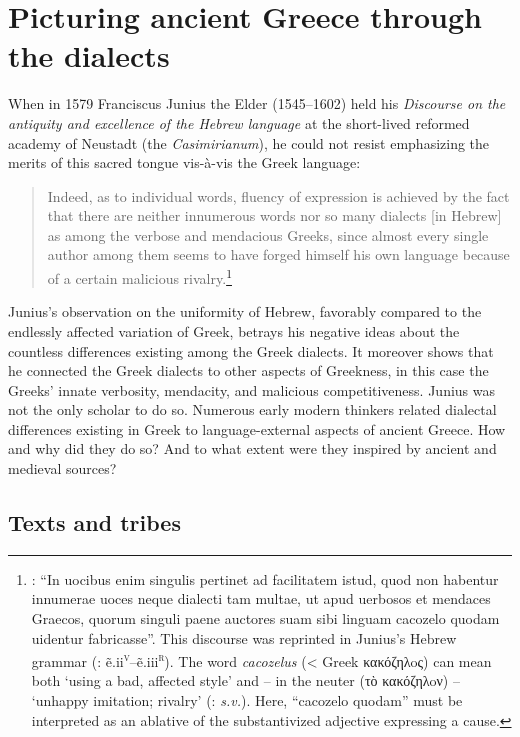 \chapter{Picturing ancient Greece through the dialects}\label{chap:7}\largerpage

When in 1579 Franciscus Junius the Elder (1545–1602) held his \textit{Discourse on the antiquity and excellence of the Hebrew language} at the short-lived reformed academy of Neustadt (the \textit{Casimirianum}), he could not resist emphasizing the merits of this sacred tongue vis-à-vis the Greek language:

\begin{quote}
Indeed, as to individual words, fluency of expression is achieved by the fact that there are neither innumerous words nor so many dialects [in Hebrew] as among the verbose and mendacious Greeks, since almost every single author among them seems to have forged himself his own language because of a certain malicious rivalry.\footnote{\citet[\textsc{b.3}\textsc{\textsuperscript{v}}]{Junius1579}: “In uocibus enim singulis pertinet ad facilitatem istud, quod non habentur innumerae uoces neque dialecti tam multae, ut apud uerbosos et mendaces Graecos, quorum singuli paene auctores suam sibi linguam cacozelo quodam uidentur fabricasse”. This discourse was reprinted in Junius’s Hebrew grammar (\citealt{Junius1580}: ẽ.ii\textsc{\textsuperscript{v}}–ẽ.iii\textsc{\textsuperscript{r}}). The word \textit{cacozelus} (< Greek κακόζηλoς) can mean both ‘using a bad, affected style’ and – in the neuter (τὸ κακόζηλoν) – ‘unhappy imitation; rivalry’ (\citealt{LiddellScott1940}: \textit{s.v.}). Here, “cacozelo quodam” must be interpreted as an ablative of the substantivized adjective expressing a cause.}
\end{quote}

Junius’s observation on the uniformity of Hebrew, favorably compared to the endlessly affected variation of Greek, betrays his negative ideas about the countless differences existing among the Greek dialects. It moreover shows that he connected the Greek dialects to other aspects of Greekness, in this case the Greeks’ innate verbosity, mendacity, and malicious competitiveness. Junius was not the only scholar to do so. Numerous early modern thinkers related dialectal differences existing in Greek to language-external aspects of ancient Greece. How and why did they do so? And to what extent were they inspired by ancient and medieval sources?

\section{Texts and tribes}\label{sec:7.1}

